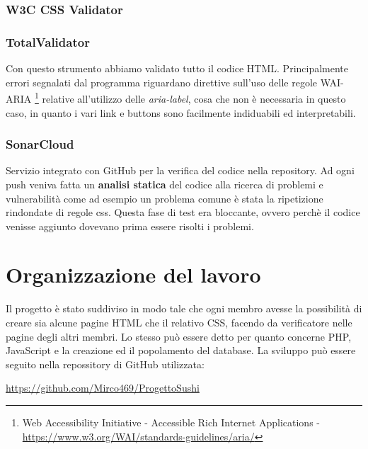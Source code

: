 \documentclass{article}
\begin{document}
			\subsubsection{W3C CSS Validator}
			\subsubsection{TotalValidator}
			    Con questo strumento abbiamo validato tutto il codice HTML. Principalmente errori segnalati dal programma riguardano direttive sull'uso delle regole WAI-ARIA%
			    \footnote{Web Accessibility Initiative - Accessible Rich Internet Applications -  \url{https://www.w3.org/WAI/standards-guidelines/aria/}}
			    relative all'utilizzo delle \textit{aria-label}, cosa che non è necessaria in questo caso, in quanto i vari link e buttons sono facilmente indiduabili ed interpretabili.
			\subsubsection{SonarCloud}
				Servizio integrato con GitHub per la verifica del codice nella repository. Ad ogni push veniva fatta un {\bfseries analisi statica} del codice alla ricerca di problemi e vulnerabilità come ad esempio un problema comune è stata la ripetizione rindondate di regole css. Questa fase di test era bloccante, ovvero perchè il codice venisse aggiunto dovevano prima essere risolti i problemi.
	\section{Organizzazione del lavoro}
		Il progetto è stato suddiviso in modo tale che ogni membro avesse la possibilità di creare sia alcune pagine HTML che il relativo CSS, facendo da verificatore nelle pagine degli altri membri.
		Lo stesso può essere detto per quanto concerne PHP, JavaScript e la creazione ed il popolamento del database.
		La sviluppo può essere seguito nella repossitory di GitHub utilizzata:
		\newline
		\newline
		\centerline{ \url{https://github.com/Mirco469/ProgettoSushi}}
\end{document}
